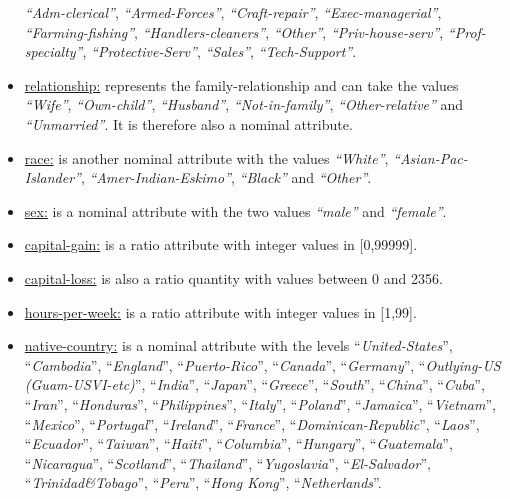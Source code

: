 \documentclass{scrartcl}[a4paper, 11pt]
\begin{document}
\begin{itemize}
        \textit{\enquote{Adm-clerical}}, \textit{\enquote{Armed-Forces}}, \textit{\enquote{Craft-repair}},
        \textit{\enquote{Exec-managerial}}, \textit{\enquote{Farming-fishing}}, \textit{\enquote{Handlers-cleaners}},
        \textit{\enquote{Other}}, \textit{\enquote{Priv-house-serv}}, \textit{\enquote{Prof-specialty}}, \textit{\enquote{Protective-Serv}}, \textit{\enquote{Sales}}, \linebreak \textit{\enquote{Tech-Support}}.
        \item \underline{relationship:} represents the family-relationship and can take the values \textit{\enquote{Wife}}, \textit{\enquote{Own-child}},  \textit{\enquote{Husband}}, \textit{\enquote{Not-in-family}}, \textit{\enquote{Other-relative}} and \textit{\enquote{Unmarried}}. It is therefore also a nominal attribute.
        \item \underline{race:} is another nominal attribute with the values  \textit{\enquote{White}},  \textit{\enquote{Asian-Pac-Islander}},  \textit{\enquote{Amer-Indian-Eskimo}},  \textit{\enquote{Black}} and  \textit{\enquote{Other}}.
        \item \underline{sex:} is a nominal attribute with the two values  \textit{\enquote{male}} and  \textit{\enquote{female}}.
        \item \underline{capital-gain:} is a ratio attribute with integer values in [0,99999]. 
        \item \underline{capital-loss:} is also a ratio quantity with values between 0 and 2356.
        \item \underline{hours-per-week:} is a ratio attribute with integer values in [1,99].
        \item \underline{native-country:} is a nominal attribute with the levels 
        \enquote{\textit{United-States}}, \enquote{\textit{Cambodia}}, \enquote{\textit{England}}, \enquote{\textit{Puerto-Rico}}, \enquote{\textit{Canada}}, \enquote{\textit{Germany}}, \enquote{\textit{Outlying-US (Guam-USVI-etc)}}, \enquote{\textit{India}}, \enquote{\textit{Japan}}, \enquote{\textit{Greece}}, \enquote{\textit{South}}, \enquote{\textit{China}}, \enquote{\textit{Cuba}}, \enquote{\textit{Iran}}, \enquote{\textit{Honduras}}, \enquote{\textit{Philippines}}, \enquote{\textit{Italy}}, \enquote{\textit{Poland}}, \enquote{\textit{Jamaica}}, \enquote{\textit{Vietnam}}, \enquote{\textit{Mexico}}, \enquote{\textit{Portugal}}, \enquote{\textit{Ireland}}, \enquote{\textit{France}}, \enquote{\textit{Dominican-Republic}}, \enquote{\textit{Laos}}, \enquote{\textit{Ecuador}}, \enquote{\textit{Taiwan}}, \enquote{\textit{Haiti}}, \enquote{\textit{Columbia}}, \enquote{\textit{Hungary}}, \enquote{\textit{Guatemala}}, \enquote{\textit{Nicaragua}}, \enquote{\textit{Scotland}}, \enquote{\textit{Thailand}}, \enquote{\textit{Yugoslavia}}, \enquote{\textit{El-Salvador}}, \enquote{\textit{Trinidad\&Tobago}}, \enquote{\textit{Peru}}, \linebreak \enquote{\textit{Hong Kong}}, \enquote{\textit{Netherlands}}.

\end{itemize}
\end{document}
